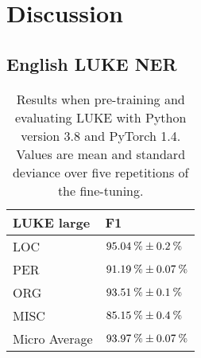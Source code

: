 \documentclass[main.tex]{subfiles}
\begin{document}
\chapter{Discussion}

\section{English LUKE NER}
\begin{table}[H]
    \begin{tabular}{ll}
        LUKE large & F1\\\hline
        LOC             & $95.04\:\text{\%{}} \pm 0.2\:\text{\%{}}$\\
        PER             & $91.19\:\text{\%{}} \pm 0.07\:\text{\%{}}$\\
        ORG             & $93.51\:\text{\%{}} \pm 0.1\:\text{\%{}}$\\
        MISC            & $85.15\:\text{\%{}} \pm 0.4\:\text{\%{}}$\\\hline
        Micro Average   & $93.97\:\text{\%{}} \pm 0.07\:\text{\%{}}$ 
    \end{tabular}
    \caption{
        Results when pre-training and evaluating LUKE with Python version 3.8 and PyTorch 1.4.
        Values are mean and standard deviance over five repetitions of the fine-tuning.
    }
\end{table}
\end{document}
